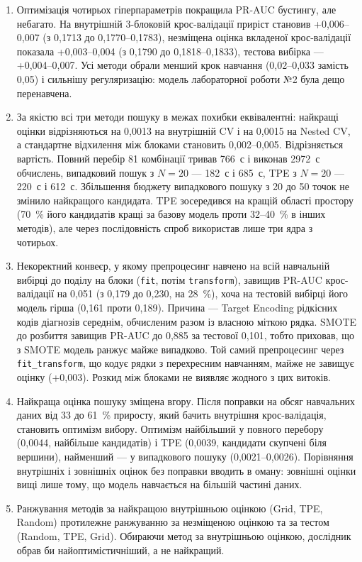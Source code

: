 \documentclass[14pt,a4paper]{extreport}
\begin{document}
\begin{enumerate}
\item Оптимізація чотирьох гіперпараметрів покращила PR-AUC бустингу, але небагато. На внутрішній 3-блоковій крос-валідації приріст становив +0,006--0,007 (з 0,1713 до 0,1770--0,1783), незміщена оцінка вкладеної крос-валідації показала +0,003--0,004 (з 0,1790 до 0,1818--0,1833), тестова вибірка --- +0,004--0,007. Усі методи обрали менший крок навчання (0,02--0,033 замість 0,05) і сильнішу регуляризацію: модель лабораторної роботи №2 була дещо перенавчена.

\item За якістю всі три методи пошуку в межах похибки еквівалентні: найкращі оцінки відрізняються на 0,0013 на внутрішній CV і на 0,0015 на Nested CV, а стандартне відхилення між блоками становить 0,002--0,005. Відрізняється вартість. Повний перебір 81 комбінації тривав 766~с і виконав 2972~с обчислень, випадковий пошук з $N = 20$ --- 182~с і 685~с, TPE з $N = 20$ --- 220~с і 612~с. Збільшення бюджету випадкового пошуку з 20 до 50 точок не змінило найкращого кандидата. TPE зосередився на кращій області простору (70~\% його кандидатів кращі за базову модель проти 32--40~\% в інших методів), але через послідовність спроб використав лише три ядра з чотирьох.

\item Некоректний конвеєр, у якому препроцесинг навчено на всій навчальній вибірці до поділу на блоки (\texttt{fit}, потім \texttt{transform}), завищив PR-AUC крос-валідації на 0,051 (з 0,179 до 0,230, на 28~\%), хоча на тестовій вибірці його модель гірша (0,161 проти 0,189). Причина --- Target Encoding рідкісних кодів діагнозів середнім, обчисленим разом із власною міткою рядка. SMOTE до розбиття завищив PR-AUC до 0,885 за тестової 0,101, тобто приховав, що з SMOTE модель ранжує майже випадково. Той самий препроцесинг через \texttt{fit\_transform}, що кодує рядки з перехресним навчанням, майже не завищує оцінку (+0,003). Розкид між блоками не виявляє жодного з цих витоків.

\item Найкраща оцінка пошуку зміщена вгору. Після поправки на обсяг навчальних даних від 33 до 61~\% приросту, який бачить внутрішня крос-валідація, становить оптимізм вибору. Оптимізм найбільший у повного перебору (0,0044, найбільше кандидатів) і TPE (0,0039, кандидати скупчені біля вершини), найменший --- у випадкового пошуку (0,0021--0,0026). Порівняння внутрішніх і зовнішніх оцінок без поправки вводить в оману: зовнішні оцінки вищі лише тому, що модель навчається на більшій частині даних.

\item Ранжування методів за найкращою внутрішньою оцінкою (Grid, TPE, Random) протилежне ранжуванню за незміщеною оцінкою та за тестом (Random, TPE, Grid). Обираючи метод за внутрішньою оцінкою, дослідник обрав би найоптимістичніший, а не найкращий.
\end{enumerate}
\end{document}
